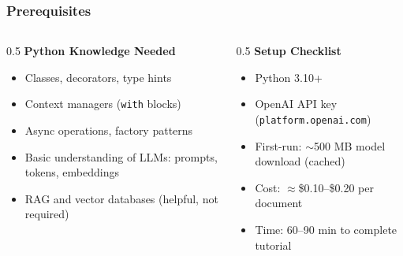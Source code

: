 \begin{frame}[fragile]\frametitle{Prerequisites}

\begin{columns}
  \begin{column}[T]{0.5\linewidth}
    \textbf{Python Knowledge Needed}
    \begin{itemize}
      \item Classes, decorators, type hints
      \item Context managers (\texttt{with} blocks)
      \item Async operations, factory patterns
      \item Basic understanding of LLMs: prompts, tokens, embeddings
      \item RAG and vector databases (helpful, not required)
    \end{itemize}
  \end{column}
  \begin{column}[T]{0.5\linewidth}
    \textbf{Setup Checklist}
    \begin{itemize}
      \item Python 3.10+
      \item OpenAI API key (\texttt{platform.openai.com})
      \item First-run: $\sim$500 MB model download (cached)
      \item Cost: $\approx$\$0.10--\$0.20 per document
      \item Time: 60--90 min to complete tutorial
    \end{itemize}
  \end{column}
\end{columns}

\end{frame}

